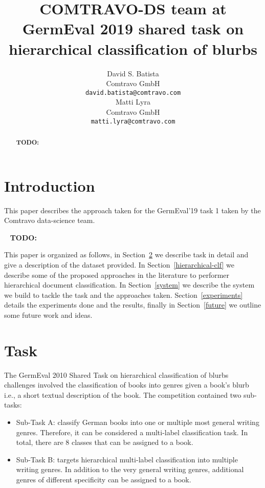 \documentclass[11pt,a4paper]{article}
\title{COMTRAVO-DS team at GermEval 2019 shared task on hierarchical classification of blurbs}
\author{David S. Batista \\
  Comtravo GmbH \\
  {\tt david.batista@comtravo.com} \\\And
  Matti Lyra \\
  Comtravo GmbH \\
  {\tt matti.lyra@comtravo.com} \\}
\date{}
\begin{document}
\maketitle
\begin{abstract}
\textbf{TODO:}
\ \newline
\end{abstract}


\section{Introduction}

This paper describes the approach taken for the GermEval'19 task 1 taken by the Comtravo data-science team.

\ \newline
\textbf{TODO:}
\ \newline

This paper is organized as follows, in Section~\ref{task} we describe task in detail and give a description of the dataset provided. In Section~\ref{hierarchical-clf} we describe some of the proposed approaches in the literature to performer hierarchical document classification. In Section~\ref{system} we describe the system we build to tackle the task and the approaches taken. Section~\ref{experiments} details the experiments done and the results, finally in Section~\ref{future} we outline some future work and ideas.

\section{Task}\label{task}

The GermEval 2010 Shared Task on hierarchical classification of blurbs challenges involved the
classification of books into genres given a book's blurb i.e., a short textual description of the
book. The competition contained two sub-tasks:

\begin{itemize}

\item Sub-Task A: classify German books into one or multiple most general writing genres. Therefore,
it can be considered a multi-label classification task. In total, there are 8 classes that can be
assigned to a book.

\item Sub-Task B: targets hierarchical multi-label classification into multiple writing genres. In
addition to the very general writing genres, additional genres of different specificity can
be assigned to a book.

\end{itemize}
\end{document}
